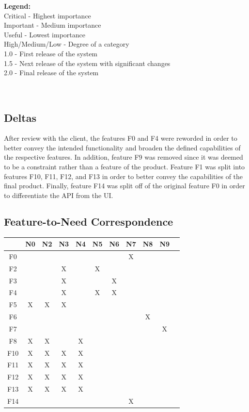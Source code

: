 \documentclass{article}
\begin{document}
\textbf{Legend:} \\
Critical - Highest importance \\
Important - Medium importance \\
Useful - Lowest importance \\
High/Medium/Low - Degree of a category \\
1.0 - First release of the system \\
1.5 - Next release of the system with significant changes \\
2.0 - Final release of the system \\
~\\
~\\
\subsection{Deltas}
After review with the client, the features F0 and F4 were reworded in order to better convey the intended functionality and broaden the defined capabilities of the respective features.  In addition, feature F9 was removed since it was deemed to be a constraint rather than a feature of the product.  Feature F1 was split into features F10, F11, F12, and F13 in order to better convey the capabilities of the final product.  Finally, feature F14 was split off of the original feature F0 in order to differentiate the API from the UI.

\subsection{Feature-to-Need Correspondence}
\begin{tabular}{ | c || c | c | c | c | c | c | c | c | c | c | }
\hline
    & N0 & N2 & N3 & N4 & N5 & N6 & N7 & N8 & N9 \\
\hline
\hline
F0  &    &    &    &    &    &    & X  &    &    \\
\hline
F2  &    &    & X  &    & X  &    &    &    &    \\
\hline
F3  &    &    & X  &    &    & X  &    &    &    \\
\hline
F4  &    &    & X  &    & X  & X  &    &    &    \\
\hline
F5  & X  & X  & X  &    &    &    &    &    &    \\
\hline
F6  &    &    &    &    &    &    &    & X  &    \\
\hline
F7  &    &    &    &    &    &    &    &    & X  \\
\hline
F8  & X  & X  &    & X  &    &    &    &    &    \\
\hline
F10 & X  & X  & X  & X  &    &    &    &    &    \\
\hline
F11 & X  & X  & X  & X  &    &    &    &    &    \\
\hline
F12 & X  & X  & X  & X  &    &    &    &    &    \\
\hline
F13 & X  & X  & X  & X  &    &    &    &    &    \\
\hline
F14 &    &    &    &    &    &    & X  &    &    \\
\hline
\end{tabular}
\end{document}
